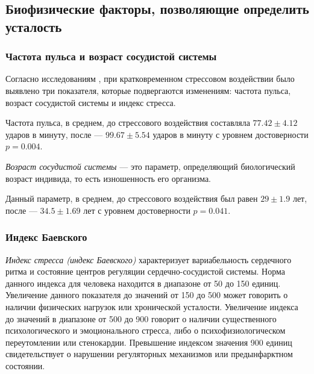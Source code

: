 \subsection{Биофизические факторы, позволяющие определить усталость}

\subsubsection{Частота пульса и возраст сосудистой системы}
Согласно исследованиям \cite{stressInvestigation}, при кратковременном стрессовом воздействии было выявлено три показателя, которые подвергаются изменениям: частота пульса, возраст сосудистой системы и индекс стресса.

Частота пульса, в среднем, до стрессового воздействия составляла $77.42 \pm 4.12$ ударов в минуту, после --- $99.67 \pm 5.54$ ударов в минуту с уровнем достоверности $p = 0.004$. \cite{stressInvestigation}

\textit{Возраст сосудистой системы} --- это параметр, определяющий биологический возраст индивида, то есть изношенность его организма. \cite{ageOfVascularSystem} 

Данный параметр, в среднем, до стрессового воздействия был равен $29 \pm 1.9$ лет, после --- $34.5 \pm 1.69$ лет с уровнем достоверности $p = 0.041$. \cite{stressInvestigation}

\subsubsection{Индекс Баевского}
\textit{Индекс стресса (индекс Баевского)} характеризует вариабельность сердечного ритма и состояние центров регуляции сердечно-сосудистой системы. Норма данного индекса для человека находится в диапазоне от 50 до 150 единиц. Увеличение данного показателя до значений от 150 до 500 может говорить о наличии физических нагрузок или хронической усталости. Увеличение индекса до значений в диапазоне от 500 до 900 говорит о наличии существенного психологического и эмоционального стресса, либо о психофизиологическом переутомлении или стенокардии. Превышение индексом значения 900 единиц свидетельствует о нарушении регуляторных механизмов или предынфарктном состоянии. \cite{stressIndex}


